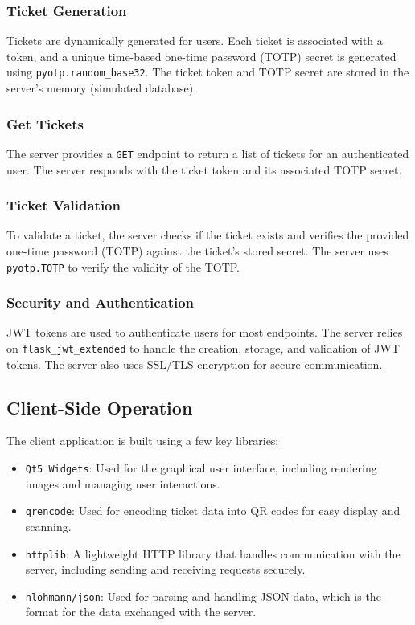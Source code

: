 \subsubsection{Ticket Generation}
Tickets are dynamically generated for users. Each ticket is associated with a token, and a unique time-based one-time password (TOTP) secret is generated using \texttt{pyotp.random\_base32}. The ticket token and TOTP secret are stored in the server's memory (simulated database).

\subsubsection{Get Tickets}
The server provides a \texttt{GET} endpoint to return a list of tickets for an authenticated user. The server responds with the ticket token and its associated TOTP secret.

\subsubsection{Ticket Validation}
To validate a ticket, the server checks if the ticket exists and verifies the provided one-time password (TOTP) against the ticket's stored secret. The server uses \texttt{pyotp.TOTP} to verify the validity of the TOTP. 

\subsubsection{Security and Authentication}
JWT tokens are used to authenticate users for most endpoints. The server relies on \texttt{flask\_jwt\_extended} to handle the creation, storage, and validation of JWT tokens. The server also uses SSL/TLS encryption for secure communication.


\subsection{Client-Side Operation}
The client application is built using a few key libraries:
\begin{itemize}
    \item \texttt{Qt5 Widgets}: Used for the graphical user interface, including rendering images and managing user interactions.
    \item \texttt{qrencode}: Used for encoding ticket data into QR codes for easy display and scanning.
    \item \texttt{httplib}: A lightweight HTTP library that handles communication with the server, including sending and receiving requests securely.
    \item \texttt{nlohmann/json}: Used for parsing and handling JSON data, which is the format for the data exchanged with the server.
\end{itemize}

